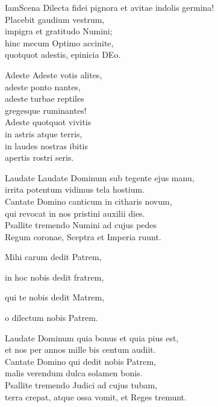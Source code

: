 \documentclass[tocstyle=ref-genre]{ees}
\begin{document}
{\begin{movement}{IamScena}
  Dilecta fidei pignora et avitae indolis germina!\\
  Placebit gaudium vestrum,\\
  impigra et gratitudo Numini;\\
  hinc mecum Optimo accinite,\\
  quotquot adestis, epinicia DEo.
\end{movement}

\begin{movement}{Adeste}
  Adeste votis alites,\\
  adeste ponto nantes,\\
  adeste turbae reptiles\\
  gregesque ruminantes!\\
  Adeste quotquot vivitis\\
  in astris atque terris,\\
  in laudes nostras ibitis\\
  apertis rostri seris.
\end{movement}

\begin{movement}{Laudate}
  \voice[Coro]
  Laudate Dominum sub tegente ejus manu,\\
  irrita potentum vidimus tela hostium.\\
  Cantate Domino canticum in citharis novum,\\
  qui revocat in nos pristini auxilii dies.\\
  Psallite tremendo Numini ad cujus pedes\\
  Regum coronae, Sceptra et Imperia ruunt.

  Mihi carum dedit Patrem,

  in hoc nobis dedit fratrem,

  qui te nobis dedit Matrem,

  \voice[Soli]
  o dilectum nobis Patrem.

  \voice[Coro]
  Laudate Dominum quia bonus et quia pius est,\\
  et nos per annos mille bis centum audiit.\\
  Cantate Domino qui dedit nobis Patrem,\\
  malis verendum dulca solamen bonis.\\
  Psallite tremendo Judici ad cujus tubam,\\
  terra crepat, atque ossa vomit, et Reges tremunt.
\end{movement}

}
\end{document}

